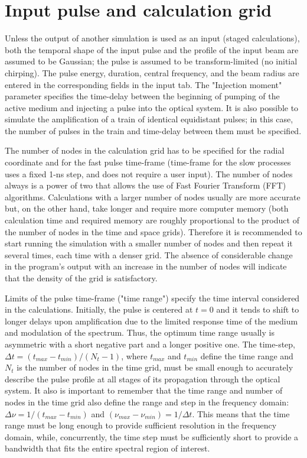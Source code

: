 \documentclass{report}
\begin{document}
\section{Input pulse and calculation grid}
Unless the output of another simulation is used as an input (staged calculations), both the temporal shape of the input pulse and the profile of the input beam are assumed to be Gaussian; the pulse is assumed to be transform-limited (no initial chirping). The pulse energy, duration, central frequency, and the beam radius are entered in the corresponding fields in the input tab. The "Injection moment" parameter specifies the time-delay between the beginning of pumping of the active medium and injecting a pulse into the optical system. It is also possible to simulate the amplification of a train of identical equidistant pulses; in this case, the number of pulses in the train and time-delay between them must be specified.

The number of nodes in the calculation grid has to be specified for the radial coordinate and for the fast pulse time-frame (time-frame for the slow processes uses a fixed 1-ns step, and does not require a user input). The number of nodes always is a power of two that allows the use of Fast Fourier Transform (FFT) algorithms. Calculations with a larger number of nodes  usually are more accurate but, on the other hand, take longer and require more computer memory (both calculation time and required memory are roughly proportional to the product of the number of  nodes in the time and space grids). Therefore it  is recommended to start  running the simulation with a smaller number of nodes and then repeat it several times, each time with a denser grid. The absence of considerable change in the program’s output with an increase in the number of nodes will indicate that the density of the grid is satisfactory.

Limits of the pulse time-frame ("time range") specify the time interval considered in the calculations. Initially, the pulse is centered at $t=0$ and it tends to shift to longer delays upon amplification due to the limited response time of the medium and modulation of the spectrum. Thus, the optimum time range usually is asymmetric with a short negative part and a longer positive one. The time-step, $\Delta t=(t_{max}-t_{min})/(N_t-1)$, where $t_{max}$ and $t_{min}$ define the time range and $N_t$ is the number of nodes in the time grid, must be small enough to accurately describe the pulse profile at all stages of its  propagation through the optical system. It also is important to remember that the time range and number of nodes in the time grid also define the range and step in the frequency domain: $\Delta\nu=1/(t_{max}-t_{min})$ and $(\nu_{max}-\nu_{min})=1/\Delta t$. This means that the time range must be long enough to provide sufficient resolution in the frequency domain, while, concurrently, the time step must be sufficiently short to provide a bandwidth that fits the entire spectral region of interest.
\end{document}
